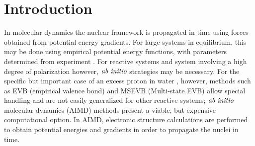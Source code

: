 \chapter{Introduction}

In molecular dynamics the nuclear framework is propagated in time using forces obtained
from potential energy gradients. For large systems in equilibrium, this may be done
using empirical potential energy functions, with parameters determined from experiment
\cite{Allen, Ciccotti, Haberlandt, Frenkel, Binder, Berne, Esser}. For reactive systems
and system involving a high degree of polarization \cite{polarizability1, polarizability2,
aqc,LOOK for more} however, $\it{ab~ initio}$
 strategies may be necessary. For the specific but important case of an excess proton
in water \cite{James, VothDay,PetersenIyengar,IyengarPetersen, fragAIMD-elbo, fragAIMD-CC,fragAIMD},
however, methods such as EVB (empirical valence bond) \cite{jacs102.6218}
and MSEVB (Multi-state EVB) \cite{VothDay} allow special
handling and are not easily generalized for other reactive systems;
$\it{ab~ initio}$ molecular dynamics (AIMD) \cite{KarplusBO1, Leforestier-BO, Helgaker-AIBO,
BO-Hase, bernyPESreview, pulay, CPchargedsystems, CP, Madden, Marx-Cpreview, Cpdensity,
Cptuckerman1, Cptuckerman3, Cpcpks, Carpar89, Galli91, Parrinello-harmonic, Na+solv, NH4+solv,
K+solv, SO3solv, Be2+solv, H+OH-solv, Parrinello:ClH2O6, CarPar-Laasonen, CP-Wannier1,
Marzari-Vanderbilt-Wannier, Kohn-Wannier, CP-Gaussians1, CP-Gaussians2, CP-Gaussians-Martyna,
Galli-mu-problem-BOCP, Galli-mu-problem, carter1, carter2, carter3} methods present a viable, but expensive
computational option. In AIMD, electronic structure calculations are performed to obtain
potential energies and gradients in order to propagate the nuclei in time.

